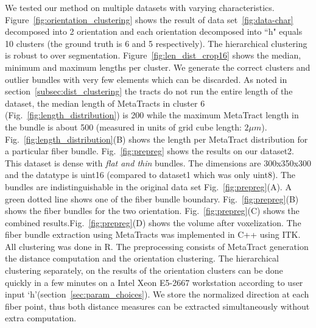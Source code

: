 We tested our method on multiple datasets with varying characteristics. 
Figure~\ref{fig:orientation_clustering} shows the result of data set~\ref{fig:data-char} decomposed into 2 orientation and each orientation decomposed into ``h" equals 10 clusters (the ground truth is 6 and 5 respectively). The hierarchical clustering is robust to over segmentation.
Figure~\ref{fig:len_dist_crop16} shows the median, minimum and maximum lengths per cluster. We generate the correct clusters and outlier bundles with very few elements which can be discarded. As noted in section~\ref{subsec:dist_clustering} the tracts do not run the entire length of the dataset, the median length of MetaTracts in cluster 6 (Fig.~\ref{fig:length_distribution}) is 200 while the maximum MetaTract length in the bundle is about 500 (measured in units of grid cube length: $2\mu m$). Fig.~\ref{fig:length_distribution}(B) shows the length per MetaTract distribution for a particular fiber bundle. 
Fig.~\ref{fig:prepreg} shows the results on our dataset2. This dataset is dense with \textit{flat and thin} bundles. The dimensions are 300x350x300 and the datatype is uint16 (compared to dataset1 which was only uint8). The bundles are indistinguishable in the original data set Fig.~\ref{fig:prepreg}(A). A green dotted line shows one of the fiber bundle boundary. Fig.~\ref{fig:prepreg}(B) shows the fiber bundles for the two orientation. Fig.~\ref{fig:prepreg}(C) shows the combined results.Fig.~\ref{fig:prepreg}(D) shows the volume after voxelization.
The fiber bundle extraction using MetaTracts was implemented in C++ using ITK. All clustering was done in R. The preprocessing consists of MetaTract generation the distance computation and the orientation clustering. The hierarchical clustering separately, on the results of the orientation clusters can be done quickly in a few minutes on a Intel Xeon E5-2667 workstation according to user input `h'(section~\ref{sec:param_choices}). We store the normalized direction at each fiber point, thus both distance measures can be extracted simultaneously without extra computation.


